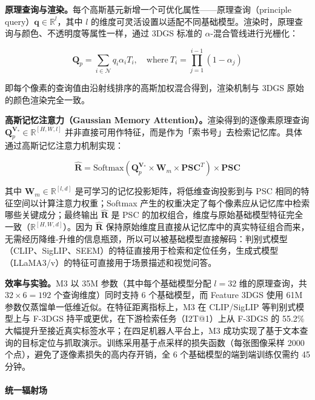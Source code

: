 \textbf{原理查询与渲染。}每个高斯基元新增一个可优化属性——原理查询（principle query）$\mathbf{q} \in \mathbb{R}^{l}$，其中 $l$ 的维度可灵活设置以适配不同基础模型。渲染时，原理查询与颜色、不透明度等属性一样，通过 3DGS 标准的 $\alpha$-混合管线进行光栅化：

\begin{equation}
\mathbf{Q}_p = \sum_{i \in \mathcal{N}} q_i \alpha_i T_i, \quad \text{where}\ T_i = \prod_{j=1}^{i-1}(1 - \alpha_j)
\end{equation}

即每个像素的查询值由沿射线排序的高斯加权混合得到，渲染机制与 3DGS 原始的颜色渲染完全一致。

\textbf{高斯记忆注意力（Gaussian Memory Attention）。}渲染得到的逐像素原理查询 $\mathbf{Q}_p^{\mathbf{V}_*} \in \mathbb{R}^{[H, W, l]}$ 并非直接可用作特征，而是作为「索书号」去检索记忆库。具体通过高斯记忆注意力机制实现：

\begin{equation}
\hat{\mathbf{R}} = \text{Softmax}(\mathbf{Q}_p^{\mathbf{V}_*} \times \mathbf{W}_m \times \mathbf{PSC}^T) \times \mathbf{PSC}
\end{equation}

其中 $\mathbf{W}_m \in \mathbb{R}^{[l, d]}$ 是可学习的记忆投影矩阵，将低维查询投影到与 PSC 相同的特征空间以计算注意力权重；Softmax 产生的权重决定了每个像素应从记忆库中检索哪些关键成分；最终输出 $\hat{\mathbf{R}}$ 是 PSC 的加权组合，维度与原始基础模型特征完全一致（$\mathbb{R}^{[H, W, d]}$）。因为 $\hat{\mathbf{R}}$ 保持原始维度且直接从记忆库中的真实特征组合而来，无需经历降维-升维的信息瓶颈，所以可以被基础模型直接解码：判别式模型（CLIP、SigLIP、SEEM）的特征直接用于检索和定位任务，生成式模型（LLaMA3/v）的特征可直接用于场景描述和视觉问答。

\textbf{效率与实验。}M3 以 35M 参数（其中每个基础模型分配 $l{=}32$ 维的原理查询，共 $32 \times 6{=}192$ 个查询维度）同时支持 6 个基础模型，而 Feature 3DGS 使用 61M 参数仅蒸馏单一低维近似。在特征距离指标上，M3 在 CLIP/SigLIP 等判别式模型上与 F-3DGS 持平或更优，在下游检索任务（I2T@1）上从 F-3DGS 的 55.2\% 大幅提升至接近真实标签水平；在四足机器人平台上，M3 成功实现了基于文本查询的目标定位与抓取演示。训练采用基于点采样的损失函数（每张图像采样 2000 个点），避免了逐像素损失的高内存开销，全 6 个基础模型的端到端训练仅需约 45 分钟。

\paragraph{统一辐射场}

